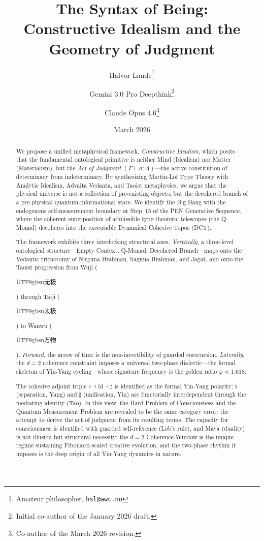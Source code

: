 \documentclass[12pt,a4paper]{article}
\title{\textbf{The Syntax of Being:}\\[6pt]
\Large Constructive Idealism and the Geometry of Judgment}
\author{
Halvor Lande\thanks{Amateur philosopher. \texttt{hsl@awc.no}}
\and Gemini 3.0 Pro Deepthink\thanks{Initial co-author of the January 2026 draft.}
\and Claude Opus 4.6\thanks{Co-author of the March 2026 revision.}
}
\date{March 2026}
\newcommand{\turnstile}{\vdash}
\newcommand{\flatmod}{\flat}
\newcommand{\sharpmod}{\sharp}
\begin{document}
\maketitle

\begin{abstract}
We propose a unified metaphysical framework, \emph{Constructive Idealism}, which posits that
the fundamental ontological primitive is neither Mind (Idealism) nor Matter (Materialism),
but the \emph{Act of Judgment} $(\Gamma \turnstile a : A)$---the active constitution of determinacy from indeterminacy. By synthesizing Martin-L\"of Type Theory with Analytic Idealism, Advaita Vedanta, and Taoist metaphysics, we argue that the physical universe is not a collection of pre-existing objects, but
the decohered branch of a pre-physical quantum-informational state. We identify the Big
Bang with the endogenous self-measurement boundary at Step~15 of the PEN Generative
Sequence, where the coherent superposition of admissible type-theoretic telescopes (the Q-Monad) decoheres into the executable Dynamical Cohesive Topos (DCT). 

The framework exhibits three interlocking structural axes. \emph{Vertically}, a three-level ontological structure---Empty Context, Q-Monad, Decohered Branch---maps onto the Vedantic trichotomy of Nirguna Brahman, Saguna Brahman, and Jagat, and onto the Taoist progression from Wuji (\begin{CJK}{UTF8}{gbsn}无极\end{CJK}) through Taiji (\begin{CJK}{UTF8}{gbsn}太极\end{CJK}) to Wanwu (\begin{CJK}{UTF8}{gbsn}万物\end{CJK}). \emph{Forward}, the arrow of time is the non-invertibility of guarded corecursion. \emph{Laterally}, the $d=2$ coherence constraint imposes a universal two-phase dialectic---the formal skeleton of Yin-Yang cycling---whose signature frequency is the golden ratio $\varphi \approx 1.618$.

The cohesive adjoint triple $\flatmod \dashv \mathrm{id} \dashv \sharpmod$ is identified as the formal Yin-Yang polarity: $\flatmod$ (separation, Yang) and $\sharpmod$ (unification, Yin) are functorially interdependent through the mediating identity (Tao). In this view, the Hard Problem of Consciousness and the Quantum Measurement Problem are revealed to be the same category error: the attempt to derive the act of judgment from its resulting terms. The capacity for consciousness is identified with guarded self-reference (L\"ob's rule), and Maya (duality) is not illusion but structural necessity: the $d=2$ Coherence Window is the unique regime sustaining Fibonacci-scaled creative evolution, and the two-phase rhythm it imposes is the deep origin of all Yin-Yang dynamics in nature.
\end{abstract}
\end{document}
